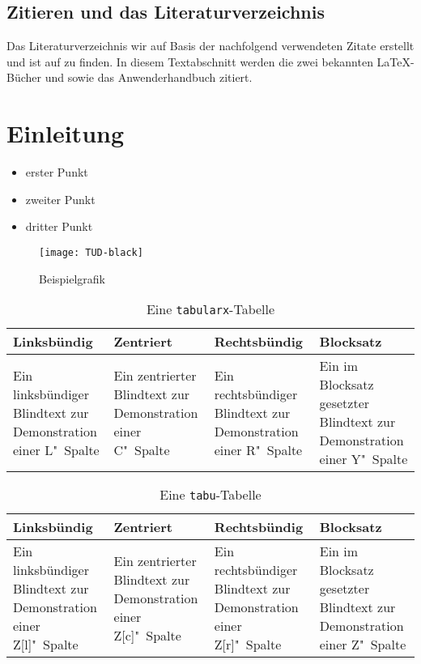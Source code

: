 \documentclass[english,ngerman]{tudscrreprt}
\begin{document}
\section{Zitieren und das Literaturverzeichnis}
Das Literaturverzeichnis wir auf Basis der nachfolgend verwendeten
Zitate erstellt und ist auf \pageref{sec:bibliography} zu finden.
In diesem Textabschnitt werden die zwei bekannten \LaTeX-Bücher
\cite{knuth84} und \cite{goossens94} sowie das Anwenderhandbuch
\cite{hanisch14} zitiert.
\chapter{Einleitung}
\begin{itemize}
\item erster Punkt
\item zweiter Punkt
\item dritter Punkt
\end{itemize}
\begin{figure}
\centering
\texttt{[image: TUD-black]}
\caption{Beispielgrafik}\label{fig:example}
\end{figure}
\begin{table}
\begin{tabularx}{\textwidth}{@{}LCRY@{}}
\toprule
\textbf{Linksbündig} & \textbf{Zentriert} &
\textbf{Rechtsbündig} & \textbf{Blocksatz} \tabularnewline
\midrule
Ein linksbündiger Blindtext zur Demonstration einer L"~Spalte &
Ein zentrierter Blindtext zur Demonstration einer C"~Spalte &
Ein rechtsbündiger Blindtext zur Demonstration einer R"~Spalte &
Ein im Blocksatz gesetzter Blindtext zur Demonstration einer Y"~Spalte
\tabularnewline
\bottomrule
\end{tabularx}
\caption{Eine \texttt{tabularx}-Tabelle}\label{tab:tabularx}
\end{table}
\makeatletter
\newcolumntype{Z}{}
\renewcommand*\NC@rewrite@Z[1][]{%
\NC@find>{\hspace{0pt}}X[#1]<{\@finalstrut\@arstrutbox}%
}
\makeatother
\begin{table}
\caption{Eine \texttt{tabu}-Tabelle}\label{tab:tabu}
\begin{tabu} to 
\toprule
\textbf{Linksbündig} & \textbf{Zentriert} &
\textbf{Rechtsbündig} & \textbf{Blocksatz} \tabularnewline
\midrule
Ein linksbündiger Blindtext zur Demonstration einer Z[l]"~Spalte &
Ein zentrierter Blindtext zur Demonstration einer Z[c]"~Spalte &
Ein rechtsbündiger Blindtext zur Demonstration einer Z[r]"~Spalte &
Ein im Blocksatz gesetzter Blindtext zur Demonstration einer Z"~Spalte
\tabularnewline
\bottomrule
\end{tabu}
\end{table}
\printbibliography\label{sec:bibliography}
\end{document}
